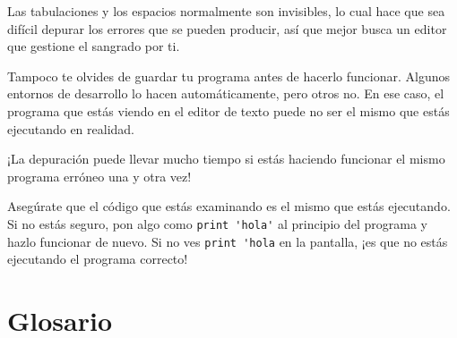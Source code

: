 
Las tabulaciones y los espacios normalmente son invisibles, lo cual hace
que sea difícil depurar los errores que se pueden producir, así que mejor
busca un editor que gestione el sangrado por ti.

Tampoco te olvides de guardar tu programa antes de hacerlo funcionar. Algunos
entornos de desarrollo lo hacen automáticamente, pero otros no.
En ese caso, el programa que estás viendo en el editor de texto
puede no ser el mismo que estás ejecutando en realidad.

¡La depuración puede llevar mucho tiempo si estás haciendo funcionar el
mismo programa erróneo una y otra vez!

Asegúrate que el código que estás examinando es el mismo que estás ejecutando.
Si no estás seguro, pon algo como \verb"print 'hola'" al principio
del programa y hazlo funcionar de nuevo. Si no ves \verb"print 'hola" en la
pantalla, ¡es que no estás ejecutando el programa correcto!


\section{Glosario}

